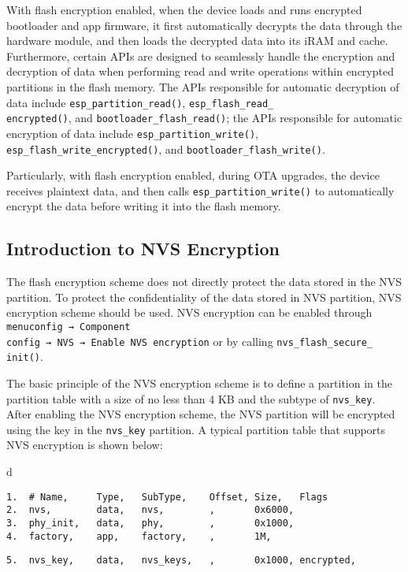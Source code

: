 \documentclass[a4paper,12pt]{book}
\begin{document}
With flash encryption enabled, when the device loads and runs encrypted bootloader and app firmware, it first automatically decrypts the data through the hardware module, and then loads the decrypted data into its iRAM and cache. Furthermore, certain APIs are designed to seamlessly handle the encryption and decryption of data when performing read and write operations within encrypted partitions in the flash memory. The APIs responsible for automatic decryption of data include \verb|esp_partition_read()|, \verb|esp_flash_read_|\\ \verb|encrypted()|, and \verb|bootloader_flash_read()|; the APIs responsible for automatic encryption of data include \verb|esp_partition_write()|, \verb|esp_flash_write_encrypted()|, and \verb|bootloader_flash_write()|.

Particularly, with flash encryption enabled, during OTA upgrades, the device receives plaintext data, and then calls \verb|esp_partition_write()| to automatically encrypt the data before writing it into the flash memory.


\subsection{Introduction to NVS Encryption}
The flash encryption scheme does not directly protect the data stored in the NVS partition. To protect the confidentiality of the data stored in NVS partition, NVS encryption scheme should be used. NVS encryption can be enabled through \verb|menuconfig → Component |\\ \verb|config → NVS → Enable NVS encryption| or by calling \verb|nvs_flash_secure_|\\ \verb|init()|.

The basic principle of the NVS encryption scheme is to define a partition in the partition table with a size of no less than 4 KB and the subtype of \verb|nvs_key|. After enabling the NVS encryption scheme, the NVS partition will be encrypted using the key in the \verb|nvs_key| partition. A typical partition table that supports NVS encryption is shown below:

\begin{codebloc}
\begin{tabular}{d}
\vspace{2pt}
\begin{verbatim}
1.  # Name,     Type,   SubType,    Offset, Size,   Flags
2.  nvs,        data,   nvs,        ,       0x6000,
3.  phy_init,   data,   phy,        ,       0x1000,
4.  factory,    app,    factory,    ,       1M,
\end{verbatim}
\verb|5.  nvs_key,    data,   nvs_keys,   ,       0x1000, encrypted,|
\end{tabular}
\end{codebloc}
\end{document}

